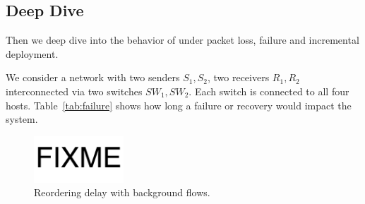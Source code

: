 \subsection{Deep Dive}


Then we deep dive into the behavior of \sys under packet loss, failure and incremental deployment.

\begin{table}
\centering
{}
\caption{
	Convergence time after failure and recovery of host and switch.
	Convergence time is the time since the event occurs until end-to-end delay recovers to normal.
    Convergence time 0 indicates not affected.
    $T_{timeout}$ is the beacon timeout for failure detection.
}
\label{tab:failure}
\end{table}

We consider a network with two senders $S_1, S_2$, two receivers $R_1, R_2$ interconnected via two switches $SW_1, SW_2$.
Each switch is connected to all four hosts.
Table~\ref{tab:failure} shows how long a failure or recovery would impact the system.


\begin{figure}[t]
\centering
\includegraphics[width=0.3\textwidth]{images/fixme.pdf}
\caption{Reordering delay with background flows.}
\label{fig:background-flow}
\end{figure}

